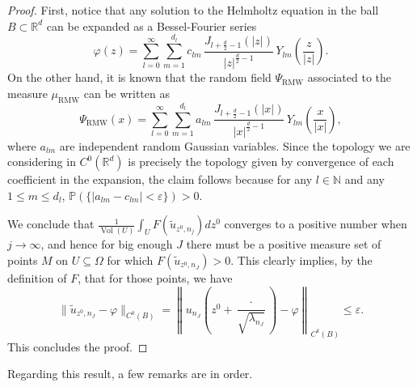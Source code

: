 \documentclass{amsart}
\theoremstyle{definition}
\theoremstyle{remark}
\newcommand{\ep}{\varepsilon}
\newcommand{\vp}{\varphi}
\newcommand{\Om}{\Omega}
\DeclareMathOperator\Vol{Vol} \DeclareMathOperator\GL{GL} \DeclareMathOperator\orto{O}
\renewcommand\leq\leqslant
\numberwithin{equation}{section}
\theoremstyle{definition}
\theoremstyle{remark}
\newcommand\muRMW{\mu_{\mathrm{RMW}}}
\newcommand\PsiR{\Psi_{\mathrm{RMW}}}
\begin{document}
\begin{proof}
	First, notice that any solution to the Helmholtz equation in the ball $B\subset \mathbb R^d$ can be expanded as a Bessel-Fourier series \begin{equation}
		\varphi(z)= \sum_{l=0}^\infty \sum_{m=1}^{d_l} c_{lm}\,\frac{J_{l+\frac d2-1}(|z|)}{|z|^{\frac d2-1}}\, Y_{lm}\left(\frac z{|z|}\right).
	\end{equation}
	On the other hand, it is known that the random field $\PsiR$ associated to the measure $\muRMW$ can be written as \begin{equation}
		\PsiR(x)= \sum_{l=0}^\infty \sum_{m=1}^{d_l} a_{lm}\,\frac{J_{l+\frac d2-1}(|x|)}{|x|^{\frac d2-1}}\, Y_{lm}\left(\frac x{|x|}\right),
	\end{equation}where $a_{lm}$ are independent random Gaussian variables.
	Since the topology we are considering in $C^0\left(\mathbb{R}^d\right)$ is precisely the topology given by convergence of each coefficient in the expansion, the claim follows because for any $l\in\mathbb{N}$ and any $1\leq m\leq d_l$, $\mathbb P(\{|a_{lm}-c_{lm}|<\varepsilon\})>0$.
	
	
	 We conclude that $\frac{1}{\Vol(U)}\int_{U}F\left(\tilde{u}_{z^0,n_j}\right)dz^0$ converges to a positive number when $j\rightarrow\infty$, and hence for big enough $J$ there must be a positive measure set of points $M$ on $U\subseteq \Om$ for which $F\left(\tilde{u}_{z^0,n_J}\right)>0$. This clearly implies, by the definition of $F$, that for those points, we have  \begin{equation}
	 	\|\tilde{u}_{z^0,n_J}-\varphi\|_{C^k(B)}=	\left\|u_{n_J}\left(z^0+\frac{\cdot}{\sqrt{\lambda_{n_J}}}\right)-\vp\right\|_{C^k(B)}\leq\ep.
	 \end{equation}This concludes the proof.\end{proof}
	Regarding this result, a few remarks are in order.
\end{document}
